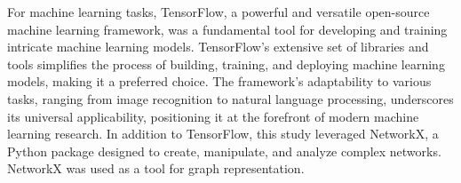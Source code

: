 For machine learning tasks, TensorFlow, a powerful and versatile open-source machine learning framework, was a fundamental tool for developing and training intricate machine learning models.
TensorFlow's extensive set of libraries and tools simplifies the process of building, training, and deploying machine learning models, making it a preferred choice.
The framework's adaptability to various tasks, ranging from image recognition to natural language processing, underscores its universal applicability, positioning it at the forefront of modern machine learning research.
In addition to TensorFlow, this study leveraged NetworkX, a Python package designed to create, manipulate, and analyze complex networks. NetworkX was used as a tool for graph representation.
